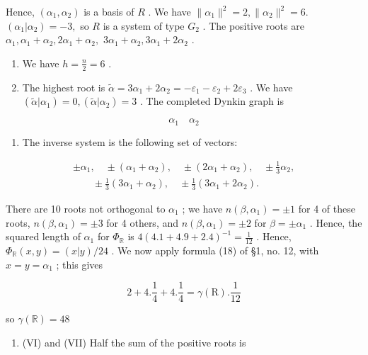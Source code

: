 Hence, \((\alpha_{1},\alpha_{2})\) is a basis of \(R\) . We have \(\| \alpha_{1}\|^{2} = 2,\| \alpha_{2}\|^{2} = 6.\) \((\alpha_{1}|\alpha_{2}) = -3,\) so \(R\) is a system of type \(G_{2}\) . The positive roots are \(\alpha_{1},\alpha_{1} + \alpha_{2},2\alpha_{1} + \alpha_{2},\) \(3\alpha_{1} + \alpha_{2},3\alpha_{1} + 2\alpha_{2}\) .

\begin{enumerate}
\def\labelenumi{(\Roman{enumi})}
\setcounter{enumi}{2}
\item
  We have \(h = \frac{n}{2} = 6\) .
\item
  The highest root is \(\tilde{\alpha} = 3\alpha_{1} + 2\alpha_{2} = -\varepsilon_{1} - \varepsilon_{2} + 2\varepsilon_{3}\) . We have \((\tilde{\alpha}|\alpha_{1}) = 0, (\tilde{\alpha}|\alpha_{2}) = 3\) . The completed Dynkin graph is
\end{enumerate}

\[
\alpha_ {1} \quad \alpha_ {2}
\]

\begin{enumerate}
\def\labelenumi{(\Alph{enumi})}
\setcounter{enumi}{21}
\tightlist
\item
  The inverse system is the following set of vectors:
\end{enumerate}

\[
\begin{array}{l} \pm \alpha_ {1}, \quad \pm (\alpha_ {1} + \alpha_ {2}), \quad \pm (2 \alpha_ {1} + \alpha_ {2}), \quad \pm \frac {1}{3} \alpha_ {2}, \\ \qquad \pm \frac {1}{3} (3 \alpha_ {1} + \alpha_ {2}), \quad \pm \frac {1}{3} (3 \alpha_ {1} + 2 \alpha_ {2}). \end{array}
\]

There are 10 roots not orthogonal to \(\alpha_{1}\) ; we have \(n(\beta, \alpha_{1}) = \pm 1\) for 4 of these roots, \(n(\beta, \alpha_{1}) = \pm 3\) for 4 others, and \(n(\beta, \alpha_{1}) = \pm 2\) for \(\beta = \pm \alpha_{1}\) . Hence, the squared length of \(\alpha_{1}\) for \(\Phi_{\mathbb{R}}\) is \(4(4.1 + 4.9 + 2.4)^{-1} = \frac{1}{12}\) . Hence, \(\Phi_{\mathbb{R}}(x, y) = (x|y)/24\) . We now apply formula (18) of §1, no. 12, with \(x = y = \alpha_{1}\) ; this gives

\[
2 + 4. \frac {1}{4} + 4. \frac {1}{4} = \gamma (\mathrm{R}). \frac {1}{12}
\]

so \(\gamma (\mathbb{R}) = 48\)

\begin{enumerate}
\def\labelenumi{(\Roman{enumi})}
\setcounter{enumi}{5}
\tightlist
\item
  (VI) and (VII) Half the sum of the positive roots is
\end{enumerate}

